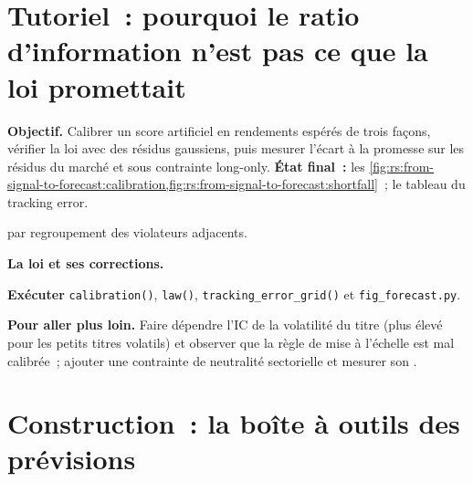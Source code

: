 \section{Tutoriel~: pourquoi le ratio d'information n'est pas ce que la loi promettait}\label{tut:rs:from-signal-to-forecast:tut}

\begin{tutorial}
\textbf{Objectif.} Calibrer un score artificiel en rendements espérés de trois façons, vérifier la loi avec des résidus gaussiens, puis mesurer l'écart à la promesse sur les
résidus du marché et sous contrainte long-only. \textbf{État final~:}
les \cref{fig:rs:from-signal-to-forecast:calibration,fig:rs:from-signal-to-forecast:shortfall}~; le tableau du tracking error.
\begin{tutsteps}
\item \textbf{} par regroupement des violateurs adjacents.
\label{lst:rs:from-signal-to-forecast:pav}
\item \textbf{La loi et ses corrections.}
\label{lst:rs:from-signal-to-forecast:law}
\item \textbf{Exécuter} \texttt{calibration()}, \texttt{law()}, \texttt{tracking\_error\_grid()} et \texttt{fig\_forecast.py}.
\end{tutsteps}
\textbf{Pour aller plus loin.} Faire dépendre l'IC de la volatilité du titre (plus élevé pour les petits titres volatils) et observer que la règle de mise à l'échelle est mal calibrée~;
ajouter une contrainte de neutralité sectorielle et mesurer son .
\end{tutorial}

\section{Construction~: la boîte à outils des prévisions}\label{bld:rs:from-signal-to-forecast:forecast}

